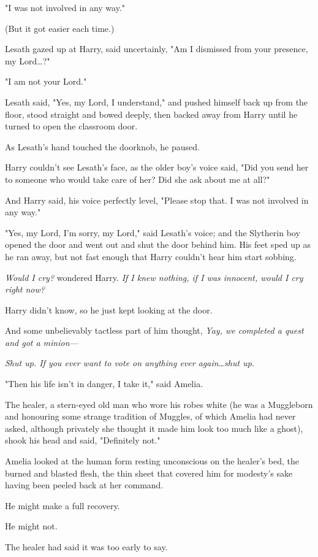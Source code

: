 "I was not involved in any way."

(But it got easier each time.)

Lesath gazed up at Harry, said uncertainly, "Am I dismissed from your presence,
my Lord…?"

"I am not your Lord."

Lesath said, "Yes, my Lord, I understand," and pushed himself back up from the
floor, stood straight and bowed deeply, then backed away from Harry until he
turned to open the classroom door.

As Lesath's hand touched the doorknob, he paused.

Harry couldn't see Lesath's face, as the older boy's voice said, "Did you send
her to someone who would take care of her? Did she ask about me at all?"

And Harry said, his voice perfectly level, "Please stop that. I was not
involved in any way."

"Yes, my Lord, I'm sorry, my Lord," said Lesath's voice; and the Slytherin boy
opened the door and went out and shut the door behind him. His feet sped up as
he ran away, but not fast enough that Harry couldn't hear him start sobbing.

\emph{Would I cry?} wondered Harry. \emph{If I knew nothing, if I was innocent,
would I cry right now?}

Harry didn't know, so he just kept looking at the door.

And some unbelievably tactless part of him thought, \emph{Yay, we completed a
quest and got a minion—}

\emph{Shut up. If you ever want to vote on anything ever again…shut up.}

"Then his life isn't in danger, I take it," said Amelia.

The healer, a stern-eyed old man who wore his robes white (he was a Muggleborn
and honouring some strange tradition of Muggles, of which Amelia had never
asked, although privately she thought it made him look too much like a ghost),
shook his head and said, "Definitely not."

Amelia looked at the human form resting unconscious on the healer's bed, the
burned and blasted flesh, the thin sheet that covered him for modesty's sake
having been peeled back at her command.

He might make a full recovery.

He might not.

The healer had said it was too early to say.

